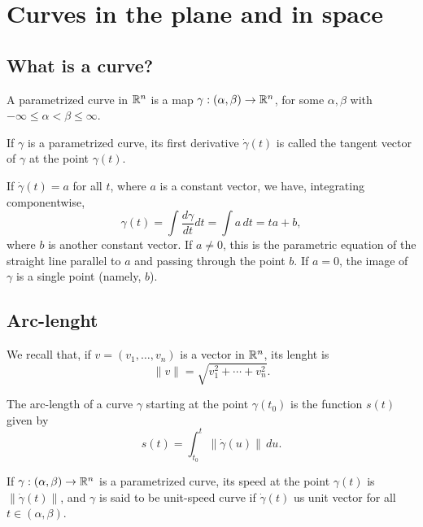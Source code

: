 \section{Curves in the plane and in space}

\subsection{What is a curve?}

\begin{defn}
  A parametrized curve in $\mathbb{R}^n$
  is a map $\gamma: (\alpha, \beta) \to \mathbb{R}^n$,
  for some $\alpha, \beta$ with $-\infty \leq \alpha < \beta \leq \infty$.
\end{defn}

\begin{defn}
  If $\gamma$ is a parametrized curve, its first derivative $\dot{\gamma}(t)$
  is called the tangent vector of $\gamma$ at the point $\gamma(t)$.
\end{defn}

\begin{proposition}
  If $\dot{\gamma}(t) = a$ for all $t$, where $a$ is a constant vector,
  we have, integrating componentwise,
  \[
    \gamma(t) = \int \frac{d\gamma}{dt} dt = \int a \, dt = ta + b,
  \]
  where $b$ is another constant vector.
  If $a \neq 0$, this is the parametric equation of the straight
  line parallel to $a$ and passing through the point $b$.
  If $a = 0$, the image of $\gamma$ is a single point (namely, $b$).
\end{proposition}

\subsection{Arc-lenght}

We recall that, if $v = (v_1, \dots, v_n)$ is a vector in $\mathbb{R}^n$, its lenght is
\[
    \|v\| = \sqrt{v_1^2 + \cdots + v_n^2}.
\]

\begin{defn}
  The arc-length of a curve $\gamma$ starting at the point $\gamma(t_0)$
  is the function $s(t)$ given by
  \[
    s(t) = \int_{t_0}^t \|\dot{\gamma}(u)\| \, du.
  \]
\end{defn}

\begin{defn}
  If $\gamma: (\alpha, \beta) \to \mathbb{R}^n$ is a parametrized curve,
  its speed at the point $\gamma(t)$ is $\|\dot{\gamma}(t)\|$,
  and $\gamma$ is said to be unit-speed curve if $\dot{\gamma}(t)$
  us unit vector for all $t \in (\alpha, \beta)$.
\end{defn}

